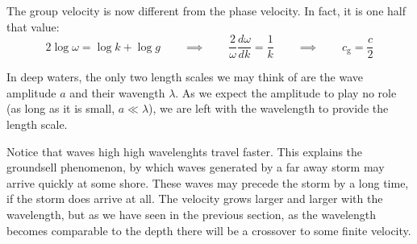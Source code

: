 The group velocity is now different from the phase velocity. In fact,
it is one half that value:
\[
2 \log\omega = \log k + \log g \qquad \implies \qquad
\frac{2}{\omega} \frac{d\omega}{dk} = \frac1{k} \qquad  \implies \qquad
c_\mathrm{g} = \frac{c}{2}
\]

In deep waters, the only two length scales we may think of are the
wave amplitude $a$ and their wavength $\lambda$. As we expect the
amplitude to play no role (as long as it is small, $a\ll\lambda$), we
are left with the wavelength to provide the length scale.

Notice that waves high high wavelenghts travel faster. This explains
the groundsell phenomenon, by which waves generated by a far away
storm may arrive quickly at some shore. These waves may precede the
storm by a long time, if the storm does arrive at all. The velocity
grows larger and larger with the wavelength, but as we have seen in
the previous section, as the wavelength becomes comparable to the
depth there will be a crossover to some finite velocity.

